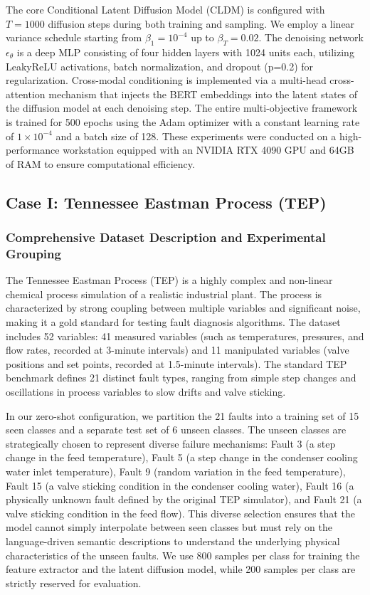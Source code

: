 \documentclass[journal]{IEEEtran}
\begin{document}
The core Conditional Latent Diffusion Model (CLDM) is configured with $T=1000$ diffusion steps during both training and sampling. We employ a linear variance schedule starting from $\beta_1=10^{-4}$ up to $\beta_T=0.02$. The denoising network $\epsilon_\theta$ is a deep MLP consisting of four hidden layers with 1024 units each, utilizing LeakyReLU activations, batch normalization, and dropout (p=0.2) for regularization. Cross-modal conditioning is implemented via a multi-head cross-attention mechanism that injects the BERT embeddings into the latent states of the diffusion model at each denoising step. The entire multi-objective framework is trained for 500 epochs using the Adam optimizer with a constant learning rate of $1 \times 10^{-4}$ and a batch size of 128. These experiments were conducted on a high-performance workstation equipped with an NVIDIA RTX 4090 GPU and 64GB of RAM to ensure computational efficiency.

\subsection{Case I: Tennessee Eastman Process (TEP)}
\label{sec:case1}

\subsubsection{Comprehensive Dataset Description and Experimental Grouping}
The Tennessee Eastman Process (TEP) is a highly complex and non-linear chemical process simulation of a realistic industrial plant. The process is characterized by strong coupling between multiple variables and significant noise, making it a gold standard for testing fault diagnosis algorithms. The dataset includes 52 variables: 41 measured variables (such as temperatures, pressures, and flow rates, recorded at 3-minute intervals) and 11 manipulated variables (valve positions and set points, recorded at 1.5-minute intervals). The standard TEP benchmark defines 21 distinct fault types, ranging from simple step changes and oscillations in process variables to slow drifts and valve sticking.

In our zero-shot configuration, we partition the 21 faults into a training set of 15 seen classes and a separate test set of 6 unseen classes. The unseen classes are strategically chosen to represent diverse failure mechanisms: Fault 3 (a step change in the feed temperature), Fault 5 (a step change in the condenser cooling water inlet temperature), Fault 9 (random variation in the feed temperature), Fault 15 (a valve sticking condition in the condenser cooling water), Fault 16 (a physically unknown fault defined by the original TEP simulator), and Fault 21 (a valve sticking condition in the feed flow). This diverse selection ensures that the model cannot simply interpolate between seen classes but must rely on the language-driven semantic descriptions to understand the underlying physical characteristics of the unseen faults. We use 800 samples per class for training the feature extractor and the latent diffusion model, while 200 samples per class are strictly reserved for evaluation.
\end{document}
